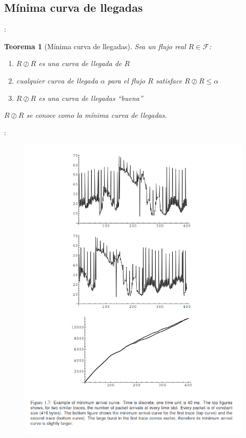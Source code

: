 \documentclass[xcolor={x11names}]{beamer}
\newtheorem{thm}{Teorema}[section] %
\begin{document}
\subsection{Mínima curva de llegadas}
\begin{frame}{\secname: \subsecname}

    \begin{thm}[Mínima curva de llegadas]
        Sea un flujo real $R\in\mathcal{F}$:
        \begin{enumerate}
            \item $R\oslash R$ es
                una curva de llegada de $R$
            \item cualquier curva
                de llegada $\alpha$ para
                el flujo $R$ satisface
                $R\oslash R\leq \alpha$
            \item $R\oslash R$ es
                una curva de llegadas
                ``buena''~\cite[Definition.1.2.4]{leboudec}
        \end{enumerate}
        $R\oslash R$ se conoce como la
        mínima curva de llegadas.
    \end{thm}
\end{frame}



\begin{frame}{\secname: \subsecname}
    \cite{leboudec}
    \begin{figure}
        \includegraphics[width=.45\textwidth]{figs/min-arrival.png}
    \end{figure}
\end{frame}
\end{document}
